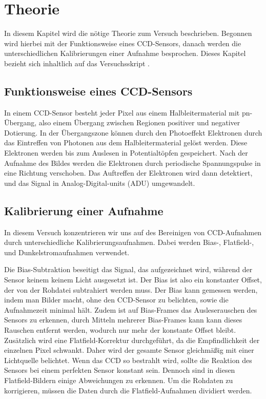\section{Theorie}
In diesem Kapitel wird die nötige Theorie zum Versuch beschrieben. Begonnen wird hierbei mit der Funktionsweise eines CCD-Sensors, danach werden die unterschiedlichen Kalibrierungen einer Aufnahme besprochen. Dieses Kapitel bezieht sich inhaltlich auf das Versuchsskript \cite{ccd}. 

\subsection{Funktionsweise eines CCD-Sensors}

In einem CCD-Sensor besteht jeder Pixel aus einem Halbleitermaterial mit pn-Übergang, also einem Übergang zwischen Regionen positiver und negativer Dotierung. In der Übergangszone können durch den Photoeffekt Elektronen durch das Eintreffen von Photonen aus dem Halbleitermaterial gelöst werden. Diese Elektronen werden bis zum Auslesen in Potentialtöpfen gespeichert. Nach der Aufnahme des Bildes werden die Elektronen durch periodische Spannungspulse in eine Richtung verschoben. Das Auftreffen der Elektronen wird dann detektiert, und das Signal in Analog-Digital-units (ADU) umgewandelt. 

\subsection{Kalibrierung einer Aufnahme}
In diesem Versuch konzentrieren wir uns auf des Bereinigen von CCD-Aufnahmen durch unterschiedliche Kalibrierungsaufnahmen. Dabei werden Bias-, Flatfield-, und Dunkelstromaufnahmen verwendet. 

Die Bias-Subtraktion beseitigt das Signal, das aufgezeichnet wird, während der Sensor keinem
keinem Licht ausgesetzt ist. Der Bias ist also ein konstanter Offset, der von der Rohdatei subtrahiert werden muss.
Der Bias kann gemessen werden, indem man Bilder macht, ohne den CCD-Sensor zu belichten, sowie die Aufnahmezeit minimal hält. Zudem ist auf Bias-Frames das Ausleserauschen des Sensors zu erkennen, durch Mitteln mehrerer Bias-Frames kann kann dieses Rauschen entfernt werden, wodurch nur mehr der konstante Offset bleibt.  
Zusätzlich wird eine Flatfield-Korrektur durchgeführt, da die Empfindlichkeit der einzelnen Pixel schwankt. Daher wird der gesamte Sensor gleichmäßig mit einer Lichtquelle belichtet.
Wenn das CCD so bestrahlt wird, sollte die Reaktion des Sensors bei einem perfekten Sensor konstant sein. Dennoch
sind in diesen Flatfield-Bildern einige Abweichungen zu erkennen. Um die Rohdaten zu korrigieren, müssen die Daten
durch die Flatfield-Aufnahmen dividiert werden.

